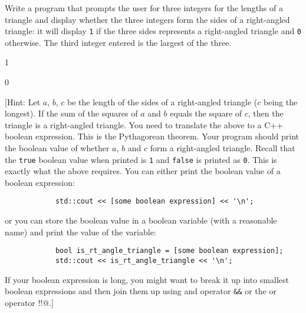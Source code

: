 Write a program that prompts the user for three integers for the lengths of a
triangle and display whether the three integers form the sides of a
right-angled triangle: it will display \verb!1! if the three sides represents
a right-angled triangle and \verb!0! otherwise. The third integer entered is
the largest of the three.

\resett
\nextt
\begin{console}[commandchars=\\\{\}]
1
\end{console}

\nextt
\begin{console}[commandchars=\\\{\}]
0
\end{console}

[Hint: Let $a$, $b$, $c$ be the length of the sides of a right-angled triangle
($c$ being the longest). If the sum of the squares of $a$ and $b$ equals the
square of $c$, then the triangle is a right-angled triangle. You need to
translate the above to a C++ boolean expression. This is the Pythagorean
theorem. Your program should print the boolean value of whether $a$, $b$ and
$c$ form a right-angled triangle. Recall that the \verb!true! boolean value
when printed is \verb!1! and \verb!false! is printed as \verb!0!. This is
exactly what the above requires. You can either print the boolean value of a
boolean expression:
\begin{verbatim}
            std::cout << [some boolean expression] << '\n';
\end{verbatim}
or you can store the boolean value in a boolean variable (with a reasonable
name) and print the value of the variable:
\begin{verbatim}
            bool is_rt_angle_triangle = [some boolean expression];
            std::cout << is_rt_angle_triangle << '\n';
\end{verbatim}
If your boolean expression is long, you might want to break it up into
smallest boolean expressions
and then join them up using and operator \verb!&&! or the or operator
\verb@!!@.]
